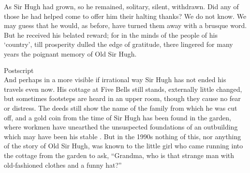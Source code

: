 As Sir Hugh had grown, so he remained, solitary, silent, withdrawn. Did any of those he had helped come to offer him their halting thanks? We do not know. We may guess that he would, as before, have turned them away with a brusque word. But he received his belated reward; for in the minds of the people of his ‘country’, till prosperity dulled the edge of gratitude, there lingered for many years the poignant memory of Old Sir Hugh.

\Flourish 

Postscript\\
And perhaps in a more visible if irrational way Sir Hugh has not ended his travels even now. His cottage at Five Bells still stands, externally little changed, but sometimes footsteps are heard in an upper room, though they cause no fear or distress. The deeds still show the name of the family from which he was cut off, and a gold coin from the time of Sir Hugh has been found in the garden, where workmen have unearthed the unsuspected foundations of an outbuilding which may have been his stable . But in the 1990s nothing of this, nor anything of the story of Old Sir Hugh, was known to the little girl who came running into the cottage from the garden to ask, “Grandma, who is that strange man with old-fashioned clothes and a funny hat?”
 